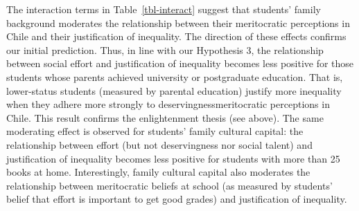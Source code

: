 \documentclass[
  letterpaper,
  DIV=11,
  numbers=noendperiod]{scrartcl}
\begin{document}
\begin{table}

\caption{\label{tbl-interact}Interactions effects}


\end{table}%

The interaction terms in Table~\ref{tbl-interact} suggest that students'
family background moderates the relationship between their meritocratic
perceptions in Chile and their justification of inequality. The
direction of these effects confirms our initial prediction. Thus, in
line with our Hypothesis 3, the relationship between social effort and
justification of inequality becomes less positive for those students
whose parents achieved university or postgraduate education. That is,
lower-status students (measured by parental education) justify more
inequality when they adhere more strongly to deservingnessmeritocratic
perceptions in Chile. This result confirms the enlightenment thesis (see
above). The same moderating effect is observed for students' family
cultural capital: the relationship between effort (but not deservingness
nor social talent) and justification of inequality becomes less positive
for students with more than 25 books at home. Interestingly, family
cultural capital also moderates the relationship between meritocratic
beliefs at school (as measured by students' belief that effort is
important to get good grades) and justification of inequality.
\end{document}
